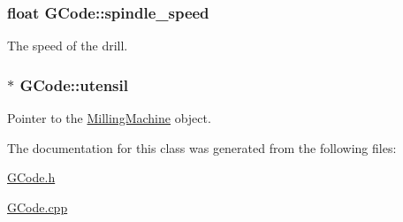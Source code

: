 \hypertarget{class_g_code_a03613c115ef107290355c78384ebee27}{
\subsubsection[{spindle\+\_\+speed}]{\setlength{\rightskip}{0pt plus 5cm}float G\+Code\+::spindle\+\_\+speed}}\label{class_g_code_a03613c115ef107290355c78384ebee27}


The speed of the drill. 

\hypertarget{class_g_code_a9a737c33f133cf515926d0f2b612bd22}{
\subsubsection[{utensil}]{$\ast$ G\+Code\+::utensil}}\label{class_g_code_a9a737c33f133cf515926d0f2b612bd22}


Pointer to the \hyperlink{class_milling_machine}{Milling\+Machine} object. 



The documentation for this class was generated from the following files\+:\begin{DoxyCompactItemize}
\item 
\hyperlink{_g_code_8h}{G\+Code.\+h}\item 
\hyperlink{_g_code_8cpp}{G\+Code.\+cpp}\end{DoxyCompactItemize}
